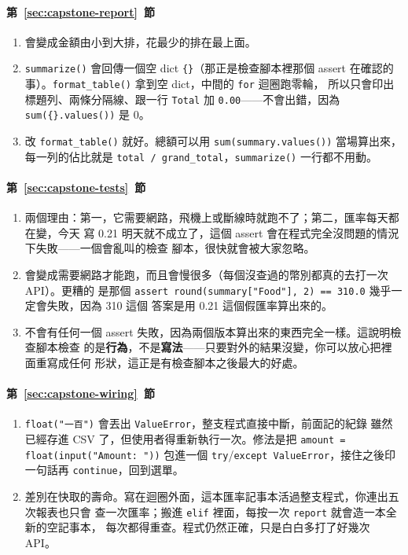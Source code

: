 \paragraph{第~\ref{sec:capstone-report}~節}
\begin{enumerate}
\item 會變成金額由小到大排，花最少的排在最上面。
\item \texttt{summarize()} 會回傳一個空 dict \texttt{\{\}}（那正是檢查腳本裡那個 assert
在確認的事）。\texttt{format\_table()} 拿到空 dict，中間的 \texttt{for} 迴圈跑零輪，
所以只會印出標題列、兩條分隔線、跟一行 \texttt{Total} 加 \texttt{0.00}——不會出錯，因為
\texttt{sum(\{\}.values())} 是 0。
\item 改 \texttt{format\_table()} 就好。總額可以用
\texttt{sum(summary.values())} 當場算出來，每一列的佔比就是
\texttt{total / grand\_total}，\texttt{summarize()} 一行都不用動。
\end{enumerate}

\paragraph{第~\ref{sec:capstone-tests}~節}
\begin{enumerate}
\item 兩個理由：第一，它需要網路，飛機上或斷線時就跑不了；第二，匯率每天都在變，今天
寫 0.21 明天就不成立了，這個 assert 會在程式完全沒問題的情況下失敗——一個會亂叫的檢查
腳本，很快就會被大家忽略。
\item 會變成需要網路才能跑，而且會慢很多（每個沒查過的幣別都真的去打一次 API）。更糟的
是那個 \texttt{assert round(summary["Food"], 2) == 310.0} 幾乎一定會失敗，因為 310 這個
答案是用 0.21 這個假匯率算出來的。
\item 不會有任何一個 assert 失敗，因為兩個版本算出來的東西完全一樣。這說明檢查腳本檢查
的是\textbf{行為}，不是\textbf{寫法}——只要對外的結果沒變，你可以放心把裡面重寫成任何
形狀，這正是有檢查腳本之後最大的好處。
\end{enumerate}

\paragraph{第~\ref{sec:capstone-wiring}~節}
\begin{enumerate}
\item \texttt{float("一百")} 會丟出 \texttt{ValueError}，整支程式直接中斷，前面記的紀錄
雖然已經存進 CSV 了，但使用者得重新執行一次。修法是把
\texttt{amount = float(input("Amount: "))} 包進一個 \texttt{try}/\texttt{except
ValueError}，接住之後印一句話再 \texttt{continue}，回到選單。
\item 差別在快取的壽命。寫在迴圈外面，這本匯率記事本活過整支程式，你連出五次報表也只會
查一次匯率；搬進 \texttt{elif} 裡面，每按一次 \texttt{report} 就會造一本全新的空記事本，
每次都得重查。程式仍然正確，只是白白多打了好幾次 API。
\end{enumerate}

